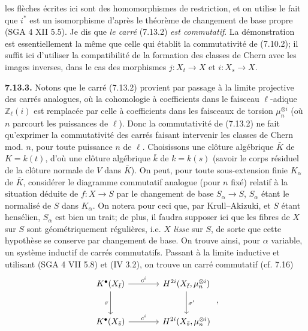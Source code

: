 les
flèches écrites ici sont des homomorphismes de restriction, et on utilise le fait que \(i^*\) est un isomorphisme d'après le théorème de changement de base propre (SGA 4 XII 5.5). Je dis que \emph{le carré} (7.13.2) \emph{est commutatif}. La démonstration est essentiellement la même que celle qui établit la commutativité de (7.10.2); il suffit ici d'utiliser la compatibilité de la formation des classes de Chern avec les images inverses, dans le cas des morphismes \(j:X_t\to X\) et \(i:X_s\to X\).

\textbf{7.13.3.} Notons que le carré (7.13.2) provient par passage à la limite projective des carrés analogues, où la cohomologie à coefficients dans le faisceau \(\ell\)-adique \(\mathbb Z_\ell(i)\) est remplacée par celle à coefficients dans les faisceaux de torsion \(\mu_n^{\otimes i}\) (où \(n\) parcourt les puissances de \(\ell\)). Donc la commutativité de (7.13.2) ne fait qu'exprimer la commutativité des carrés faisant intervenir les classes de Chern mod. \(n\), pour toute puissance \(n\) de \(\ell\). Choisissons une clôture algébrique \(\bar K\) de \(K=k(t)\), d'où une clôture algébrique \(\bar k\) de \(k=k(s)\) (savoir le corps résiduel de la clôture normale de \(V\) dans \(\bar K\)). On peut, pour toute sous-extension finie \(K_\alpha\) de \(\bar K\), considérer le diagramme commutatif analogue (pour \(n\) fixé) relatif à la situation déduite de \(f:X\to S\) par le changement de base \(S_\alpha\to S\), \(S_\alpha\) étant le normalisé de \(S\) dans \(K_\alpha\). On notera pour ceci que, par Krull--Akizuki, et \(S\) étant hensélien, \(S_\alpha\) est bien un trait; de plus, il faudra supposer ici que les fibres de \(X\) sur \(S\) sont géométriquement régulières, i.e. \(X\) \emph{lisse} sur \(S\), de sorte que cette hypothèse se conserve par changement de base. On trouve ainsi, pour \(\alpha\) variable, un système inductif de carrés commutatifs. Passant à la limite inductive et utilisant (SGA 4 VII 5.8) et (IV 3.2), on trouve un carré commutatif (cf. 7.16)
\[
\begin{tikzcd}[column sep=large,row sep=large]
K^\bullet(X_{\bar t}) \arrow[r,"c^i"] \arrow[d,"\sigma"'] &
H^{2i}(X_{\bar t},\mu_n^{\otimes i}) \arrow[d,"\sigma'"]\\
K^\bullet(X_{\bar s}) \arrow[r,"c^i"] &
H^{2i}(X_{\bar s},\mu_n^{\otimes i})
\end{tikzcd}
\;,
\]
